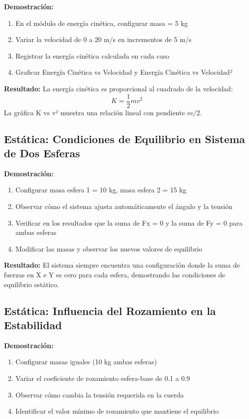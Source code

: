 \textbf{Demostración:}
\begin{enumerate}
    \item En el módulo de energía cinética, configurar masa = 5 kg
    \item Variar la velocidad de 0 a 20 m/s en incrementos de 5 m/s
    \item Registrar la energía cinética calculada en cada caso
    \item Graficar Energía Cinética vs Velocidad y Energía Cinética vs Velocidad²
\end{enumerate}

\textbf{Resultado:} La energía cinética es proporcional al cuadrado de la velocidad:
\begin{equation}
K = \frac{1}{2} m v^2
\end{equation}
La gráfica K vs v² muestra una relación lineal con pendiente $m/2$.

\subsection{Estática: Condiciones de Equilibrio en Sistema de Dos Esferas}

\textbf{Demostración:}
\begin{enumerate}
    \item Configurar masa esfera 1 = 10 kg, masa esfera 2 = 15 kg
    \item Observar cómo el sistema ajusta automáticamente el ángulo y la tensión
    \item Verificar en los resultados que  la suma de Fx = 0 y la suma de Fy = 0 para ambas esferas
    \item Modificar las masas y observar los nuevos valores de equilibrio
\end{enumerate}

\textbf{Resultado:} El sistema siempre encuentra una configuración donde la suma de fuerzas en X e Y es cero para cada esfera, demostrando las condiciones de equilibrio estático.

\subsection{Estática: Influencia del Rozamiento en la Estabilidad}

\textbf{Demostración:}
\begin{enumerate}
    \item Configurar masas iguales (10 kg ambas esferas)
    \item Variar el coeficiente de rozamiento esfera-base de 0.1 a 0.9
    \item Observar cómo cambia la tensión requerida en la cuerda
    \item Identificar el valor mínimo de rozamiento que mantiene el equilibrio
\end{enumerate}

